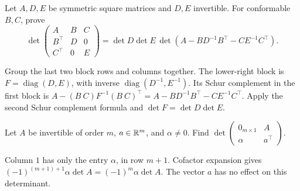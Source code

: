 \begin{problem}\label{ex:07:three-blocks}
Let \(A,D,E\) be symmetric square matrices and \(D,E\) invertible.
For conformable \(B,C\), prove
\[
 \det\begin{pmatrix}A&B&C\\B^\top&D&0\\C^\top&0&E\end{pmatrix}
 =\det D\det E\,\det(A-BD^{-1}B^\top-CE^{-1}C^\top).
\]
\end{problem}
\begin{solution}
Group the last two block rows and columns together. The lower-right
block is \(F=\operatorname{diag}(D,E)\), with inverse
\(\operatorname{diag}(D^{-1},E^{-1})\).
Its Schur complement in the first block is
\(A-(B\ C)F^{-1}(B\ C)^\top
=A-BD^{-1}B^\top-CE^{-1}C^\top\).
Apply the second Schur complement formula and
\(\det F=\det D\det E\).
\end{solution}

\begin{problem}\label{ex:07:border}
Let \(A\) be invertible of order \(m\), \(a\in\mathbb R^m\), and \(\alpha\ne0\).
Find
\(\det\begin{pmatrix}0_{m\times1}&A\\\alpha&a^\top\end{pmatrix}\).
\end{problem}
\begin{solution}
Column \(1\) has only the entry \(\alpha\), in row \(m+1\).
Cofactor expansion gives
\((-1)^{(m+1)+1}\alpha\det A=(-1)^m\alpha\det A\).
The vector \(a\) has no effect on this determinant.
\end{solution}
